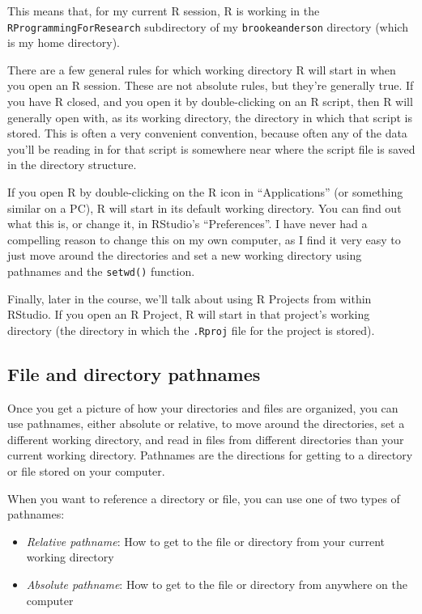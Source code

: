 \documentclass[]{book}
\providecommand{\tightlist}{%
  \setlength{\itemsep}{0pt}\setlength{\parskip}{0pt}}
\theoremstyle{definition}
\theoremstyle{definition}
\theoremstyle{definition}
\theoremstyle{remark}
\begin{document}
This means that, for my current R session, R is working in the
\texttt{RProgrammingForResearch} subdirectory of my
\texttt{brookeanderson} directory (which is my home directory).

There are a few general rules for which working directory R will start
in when you open an R session. These are not absolute rules, but they're
generally true. If you have R closed, and you open it by double-clicking
on an R script, then R will generally open with, as its working
directory, the directory in which that script is stored. This is often a
very convenient convention, because often any of the data you'll be
reading in for that script is somewhere near where the script file is
saved in the directory structure.

If you open R by double-clicking on the R icon in ``Applications'' (or
something similar on a PC), R will start in its default working
directory. You can find out what this is, or change it, in RStudio's
``Preferences''. I have never had a compelling reason to change this on
my own computer, as I find it very easy to just move around the
directories and set a new working directory using pathnames and the
\texttt{setwd()} function.

Finally, later in the course, we'll talk about using R Projects from
within RStudio. If you open an R Project, R will start in that project's
working directory (the directory in which the \texttt{.Rproj} file for
the project is stored).

\subsection{File and directory
pathnames}\label{file-and-directory-pathnames}

Once you get a picture of how your directories and files are organized,
you can use pathnames, either absolute or relative, to move around the
directories, set a different working directory, and read in files from
different directories than your current working directory. Pathnames are
the directions for getting to a directory or file stored on your
computer.

When you want to reference a directory or file, you can use one of two
types of pathnames:

\begin{itemize}
\tightlist
\item
  \emph{Relative pathname}: How to get to the file or directory from
  your current working directory
\item
  \emph{Absolute pathname}: How to get to the file or directory from
  anywhere on the computer
\end{itemize}
\end{document}
